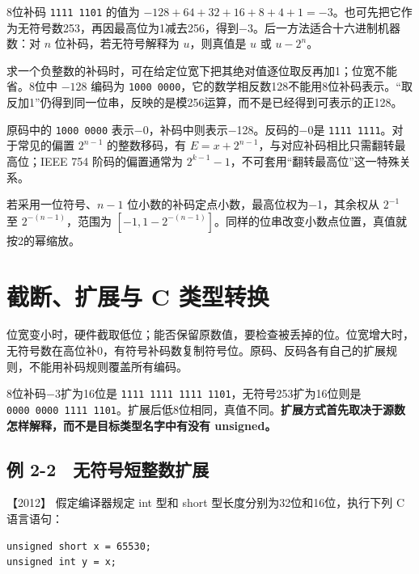 8位补码 \allowbreak{}\texttt{1111\ 1101} 的值为 \(-128+64+32+16+8+4+1=-3\)。也可先把它作为无符号数253，再因最高位为1减去256，得到−3。后一方法适合十六进制机器数：对 \(n\) 位补码，若无符号解释为 \(u\)，则真值是 \(u\) 或 \(u-2^n\)。

求一个负整数的补码时，可在给定位宽下把其绝对值逐位取反再加1；位宽不能省。8位中 \(-128\) 编码为 \allowbreak{}\texttt{1000\ 0000}，它的数学相反数128不能用8位补码表示。``取反加1''仍得到同一位串，反映的是模256运算，而不是已经得到可表示的正128。

原码中的 \allowbreak{}\texttt{1000\ 0000} 表示−0，补码中则表示−128。反码的−0是 \allowbreak{}\texttt{1111\ 1111}。对于常见的偏置 \(2^{n-1}\) 的整数移码，有 \(E=x+2^{n-1}\)，与对应补码相比只需翻转最高位；IEEE 754 阶码的偏置通常为 \(2^{k-1}-1\)，不可套用``翻转最高位''这一特殊关系。

若采用一位符号、\(n-1\) 位小数的补码定点小数，最高位权为−1，其余权从 \(2^{-1}\) 至 \(2^{-(n-1)}\)，范围为 \([-1,1-2^{-(n-1)}]\)。同样的位串改变小数点位置，真值就按2的幂缩放。

\section{截断、扩展与 C 类型转换}\label{co-02-03}

位宽变小时，硬件截取低位；能否保留原数值，要检查被丢掉的位。位宽增大时，无符号数在高位补0，有符号补码数复制符号位。原码、反码各有自己的扩展规则，不能用补码规则覆盖所有编码。

8位补码−3扩为16位是 \allowbreak{}\texttt{1111\ 1111\ 1111\ 1101}，无符号253扩为16位则是 \allowbreak{}\texttt{0000\ 0000\ 1111\ 1101}。扩展后低8位相同，真值不同。\textbf{扩展方式首先取决于源数怎样解释，而不是目标类型名字中有没有 unsigned。}

\subsection{例 2-2　无符号短整数扩展}\label{co-ex2-2}

\noindent{}【2012】 假定编译器规定 int 型和 short 型长度分别为32位和16位，执行下列 C 语言语句：

\par\medskip\noindent
\begin{minipage}{\linewidth}
\begin{verbatim}
unsigned short x = 65530;
unsigned int y = x;
\end{verbatim}
\end{minipage}\par\medskip

